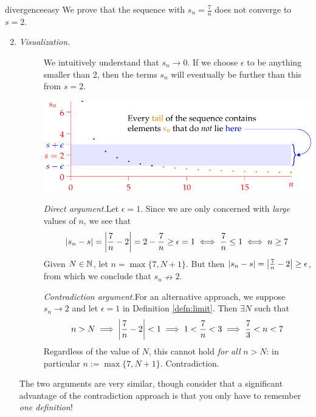 \begin{examples}{}{divergenceeasy}
	\exstart We prove that the sequence with $s_n=\frac 7n$ does not converge to $s=2$.
	\begin{enumerate}\setcounter{enumi}{1}
	  \item[]\begin{description}
	  	\item[\normalfont\emph{Visualization.}] We intuitively understand that $s_n\to 0$. If we choose $\epsilon$ to be anything smaller than 2, then the terms $s_n$ will eventually be further than this from $s=2$.
	  \begin{center}
  		\includegraphics[scale=0.9]{divergent}
  	\end{center}
  	\vspace{-5pt}
	  
  	\emph{Direct argument.}\quad Let $\epsilon=1$. Since we are only concerned with \emph{large} values of $n$, we see that
  	\[\left| s_n-s\right|=\left| \frac 7n-2\right|=2-\frac 7n\ge \epsilon= 1\iff \frac 7n\le 1\iff n\ge 7\]
  	Given $N\in\mathbb{N}$, let\footnotemark{} $n=\max\{7,N+1\}$. But then $\left| s_n-s\right|=\left| \frac 7n-2\right|\ge\epsilon$, from which we conclude that $s_n\nrightarrow 2$.
  	\smallbreak
  	
  	\emph{Contradiction argument.}\quad For an alternative approach, we suppose $s_n\to 2$ and let $\epsilon=1$ in Definition \ref{defn:limit}. Then $\exists N$ such that
  	\[n>N\implies \left| \frac 7n-2\right|<1 \implies 1<\frac 7n<3\implies \frac 73<n<7\]
  	Regardless of the value of $N$, this cannot hold \emph{for all} $n>N$: in particular $n:=\max\{7,N+1\}$. Contradiction.
	  \end{description}
  	
  	The two arguments are very similar, though consider that a significant advantage of the contradiction approach is that you only have to remember \emph{one definition}!
	\end{enumerate}


\end{examples}
